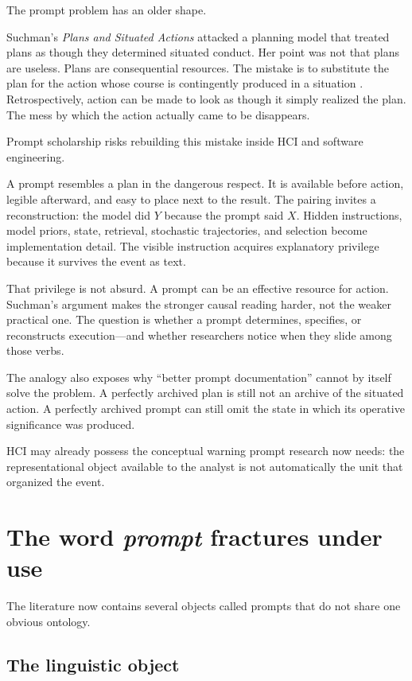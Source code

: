 \documentclass[11pt]{article}
\begin{document}
The prompt problem has an older shape.

Suchman's \emph{Plans and Situated Actions} attacked a planning model that treated plans as though they determined situated conduct. Her point was not that plans are useless. Plans are consequential resources. The mistake is to substitute the plan for the action whose course is contingently produced in a situation \citep{Suchman1987Plans}. Retrospectively, action can be made to look as though it simply realized the plan. The mess by which the action actually came to be disappears.

Prompt scholarship risks rebuilding this mistake inside HCI and software engineering.

A prompt resembles a plan in the dangerous respect. It is available before action, legible afterward, and easy to place next to the result. The pairing invites a reconstruction: the model did \(Y\) because the prompt said \(X\). Hidden instructions, model priors, state, retrieval, stochastic trajectories, and selection become implementation detail. The visible instruction acquires explanatory privilege because it survives the event as text.

That privilege is not absurd. A prompt can be an effective resource for action. Suchman's argument makes the stronger causal reading harder, not the weaker practical one. The question is whether a prompt determines, specifies, or reconstructs execution---and whether researchers notice when they slide among those verbs.

The analogy also exposes why ``better prompt documentation'' cannot by itself solve the problem. A perfectly archived plan is still not an archive of the situated action. A perfectly archived prompt can still omit the state in which its operative significance was produced.

HCI may already possess the conceptual warning prompt research now needs: the representational object available to the analyst is not automatically the unit that organized the event.

\section{The word \emph{prompt} fractures under use}

The literature now contains several objects called prompts that do not share one obvious ontology.

\subsection{The linguistic object}
\end{document}
